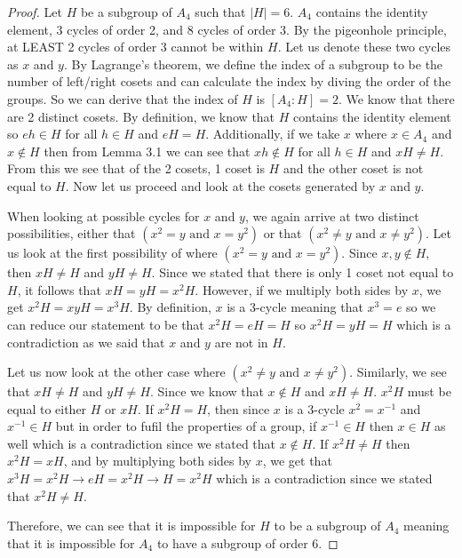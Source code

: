 \begin{proof}
Let $H$ be a subgroup of $A_4$ such that $|H| = 6$. $A_4$ contains the identity element, 3 cycles of order 2, and 8 cycles of order 3. By the pigeonhole principle, at LEAST 2 cycles of order 3 cannot be within $H$. Let us denote these two cycles as $x$ and $y$. By Lagrange's theorem, we define the index of a subgroup to be the number of left/right cosets and can calculate the index by diving the order of the groups. So we can derive that the index of $H$ is $[A_4 : H] = 2$. We know that there are 2 distinct cosets. By definition, we know that $H$ contains the identity element so $eh \in H$ for all $h\in H$ and $eH = H$. Additionally, if we take $x$ where $x\in A_4$ and $x \not\in H$ then from Lemma 3.1 we can see that $xh \not \in H $  for all $h\in H$ and $xH \neq H$. From this we see that of the 2 cosets, 1 coset is $H$ and the other coset is not equal to $H$. Now let us proceed and look at the cosets generated by $x$ and $y$.

When looking at possible cycles for $x$ and $y$, we again arrive at two distinct possibilities, either that $(x^2 = y \text{ and } x = y^2)$ or that $(x^2 \neq y \text{ and } x \neq y^2)$. Let us look at the first possibility of where $(x^2 = y \text{ and } x = y^2)$. Since $x,y \not\in H$, then $xH \neq H$ and $yH \neq H$. Since we stated that there is only 1 coset not equal to $H$, it follows that $xH = yH = x^2H$. However, if we multiply both sides by $x$, we get $x^2H = xyH = x^3H$. By definition, $x$ is a 3-cycle meaning that $x^3 = e$ so we can reduce our statement to be that $x^2H = eH = H$ so $x^2H = yH = H$ which is a contradiction as we said that $x$ and $y$ are not in $H$.

Let us now look at the other case where $(x^2 \neq y \text{ and } x \neq y^2)$. Similarly, we see that $xH \neq H$ and $yH \neq H$. Since we know that $x \not\in H$  and $xH \neq H$. $x^2H$ must be equal to either $H$ or $xH$. If $x^2H = H$, then since $x$ is a 3-cycle $x^2 = x^{-1}$ and $x^{-1}\in H$ but in order to fufil the properties of a group, if $x^{-1}\in H$ then $x\in H$ as well which is a contradiction since we stated that $x\not\in H$. If $x^2H \neq H$ then $x^2H = xH$, and by multiplying both sides by $x$, we get that $x^3H = x^2H \rightarrow eH = x^2H \rightarrow H = x^2H$ which is a contradiction since we stated that $x^2H \neq H$.

Therefore, we can see that it is impossible for $H$ to be a subgroup of $A_4$ meaning that it is impossible for $A_4$ to have a subgroup of order 6. 
\end{proof}